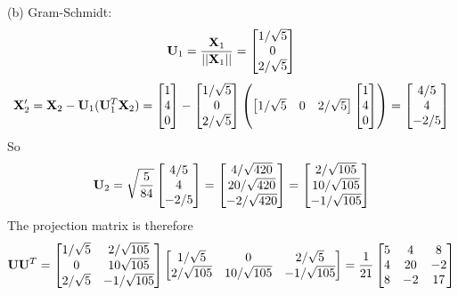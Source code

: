 \documentclass[a4paper, 12pt]{article}
\begin{document}
\begin{solution}
    (b) Gram-Schmidt: \[
    \mathbf{U}_1 = \frac{\mathbf{X}_1}{||\mathbf{X}_1||} = \begin{bmatrix}
    1 / \sqrt{5} \\
    0\\
    2/\sqrt{5}
    \end{bmatrix}
    \]
    \[
    \mathbf{X}_2' = \mathbf{X}_2 - \mathbf{U}_1(\mathbf{U}_1^T\mathbf{X}_2) = \begin{bmatrix}
    1 \\ 4 \\ 0
    \end{bmatrix} - \begin{bmatrix}
        1 / \sqrt{5} \\
        0\\
        2/\sqrt{5}
        \end{bmatrix}
        \left(\begin{bmatrix}
        1/\sqrt{5} & 0 & 2/\sqrt{5}
        \end{bmatrix}\begin{bmatrix}
        1 \\ 4 \\ 0
        \end{bmatrix}\right) = \begin{bmatrix}
        4/5 \\ 4 \\ -2/5
        \end{bmatrix}
    \]
    So \[
    \mathbf{U}_2 = \sqrt{\frac{5}{84}}\begin{bmatrix}
        4/5 \\ 4 \\ -2/5
        \end{bmatrix} =
        \begin{bmatrix}
        4/\sqrt{420} \\
        20/\sqrt{420}\\
        -2/\sqrt{420}
        \end{bmatrix} = \begin{bmatrix}
        2/\sqrt{105} \\
        10/\sqrt{105} \\
        -1/\sqrt{105}
        \end{bmatrix}
    \]
        The projection matrix is therefore \[
        \mathbf{U}\mathbf{U}^T = \begin{bmatrix}
        1/\sqrt{5} & 2/\sqrt{105} \\
        0 & 10\sqrt{105} \\
        2/\sqrt{5} & -1/\sqrt{105}
        \end{bmatrix}
        \begin{bmatrix}
        1/\sqrt{5} & 0 & 2/\sqrt{5}\\
        2/\sqrt{105} & 10/\sqrt{105} & -1/\sqrt{105}
        \end{bmatrix}
        = \frac{1}{21}\begin{bmatrix}
            5 & 4 & 8 \\
            4 & 20 & -2 \\
            8 & -2 & 17
            \end{bmatrix}
        \]


\end{solution}
\end{document}

